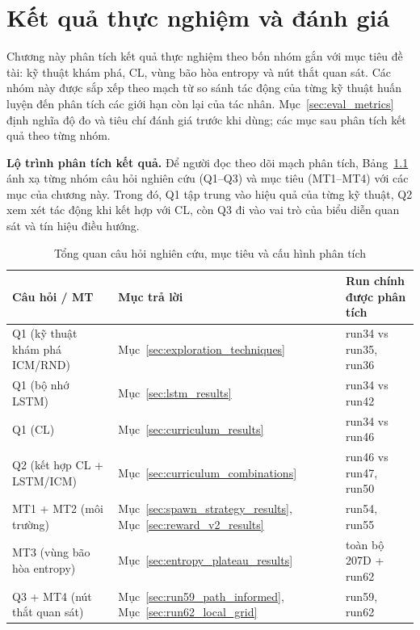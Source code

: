 \clearpage
{}
\setcounter{secnumdepth}{3}

\setcounter{chapter}{3}
\chapter[{KẾT QUẢ THỰC NGHIỆM VÀ ĐÁNH GIÁ}]{Kết quả thực nghiệm và đánh giá}

Chương này phân tích kết quả thực nghiệm theo bốn nhóm gắn với mục tiêu đề tài: kỹ thuật khám phá, CL, vùng bão hòa entropy và nút thắt quan sát. Các nhóm này được sắp xếp theo mạch từ so sánh tác động của từng kỹ thuật huấn luyện đến phân tích các giới hạn còn lại của tác nhân. Mục~\ref{sec:eval_metrics} định nghĩa độ đo và tiêu chí đánh giá trước khi dùng; các mục sau phân tích kết quả theo từng nhóm.

\textbf{Lộ trình phân tích kết quả.} Để người đọc theo dõi mạch phân tích, Bảng~\ref{tab:results_storyline} ánh xạ từng nhóm câu hỏi nghiên cứu (Q1--Q3) và mục tiêu (MT1--MT4) với các mục của chương này. Trong đó, Q1 tập trung vào hiệu quả của từng kỹ thuật, Q2 xem xét tác động khi kết hợp với CL, còn Q3 đi vào vai trò của biểu diễn quan sát và tín hiệu điều hướng.

\begin{table}[H]
    \centering
    \small
    \caption{Tổng quan câu hỏi nghiên cứu, mục tiêu và cấu hình phân tích}
    \label{tab:results_storyline}
    \begin{tabular}{|p{4cm}|p{4cm}|p{5cm}|}
        \hline
        \textbf{Câu hỏi / MT} & \textbf{Mục trả lời} & \textbf{Run chính được phân tích} \\
        \hline
        Q1 (kỹ thuật khám phá ICM/RND) & Mục~\ref{sec:exploration_techniques} & run34 vs run35, run36 \\
        \hline
        Q1 (bộ nhớ LSTM) & Mục~\ref{sec:lstm_results} & run34 vs run42 \\
        \hline
        Q1 (CL) & Mục~\ref{sec:curriculum_results} & run34 vs run46 \\
        \hline
        Q2 (kết hợp CL + LSTM/ICM) & Mục~\ref{sec:curriculum_combinations} & run46 vs run47, run50 \\
        \hline
        MT1 + MT2 (môi trường) & Mục~\ref{sec:spawn_strategy_results}, Mục~\ref{sec:reward_v2_results} & run54, run55 \\
        \hline
        MT3 (vùng bão hòa entropy) & Mục~\ref{sec:entropy_plateau_results} & toàn bộ 207D + run62 \\
        \hline
        Q3 + MT4 (nút thắt quan sát) & Mục~\ref{sec:run59_path_informed}, Mục~\ref{sec:run62_local_grid} & run59, run62 \\
        \hline
    \end{tabular}
\end{table}

